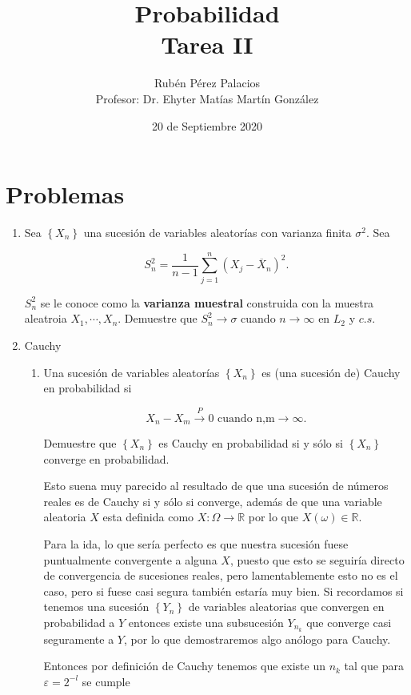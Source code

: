\documentclass[letterpaper]{article}
\title{Probabilidad \\Tarea II}
\author{Rubén Pérez Palacios\\Profesor: Dr. Ehyter Matías Martín González}
\date{20 de Septiembre 2020}
\newcommand{\pars}[1]{\left( #1 \right) }
\newcommand{\set}[1]{\left \{ #1 \right\} }
\newcommand{\R}{\mathbb{R}}
\newcommand{\1}{\mathbbm{1}}
\begin{document}
	\maketitle
    
    \section*{Problemas}

    \begin{enumerate}
        
        \item Sea $\set{X_n}$ una sucesión de variables aleatorías con varianza finita $\sigma^2$. Sea 
		
		\[S_n^2 = \frac{1}{n-1}\sum_{j=1}^n \pars{X_j - \overline{X}_n}^2.\]

		$S_n^2$ se le conoce como la \textbf{varianza muestral} construida con la muestra aleatroia \linebreak $X_1,\cdots,X_n$. Demuestre que $S_n^2\rightarrow\sigma$ cuando $n \rightarrow \infty$ en $L_2$ y $c.s$.

		\item Cauchy
		
		\begin{enumerate}
			\item Una sucesión de variables aleatorías $\set{X_n}$ es (una sucesión de) Cauchy en probabilidad si
			
			\[X_n-X_m\xrightarrow{P} 0 \text{ cuando n,m}\rightarrow\infty.\]

			Demuestre que $\set{X_n}$ es Cauchy en probabilidad si y sólo si $\set{X_n}$ converge en probabilidad.

			Esto suena muy parecido al resultado de que una sucesión de números reales es de Cauchy si y sólo si converge, además de que una variable aleatoria $X$ esta definida como $X:\Omega\rightarrow\R$ por lo que $X(\omega)\in\R$. 
			
			
			Para la ida, lo que sería perfecto es que nuestra sucesión fuese puntualmente convergente a alguna $X$, puesto que esto se seguiría directo de convergencia de sucesiones reales, pero lamentablemente esto no es el caso, pero si fuese casi segura también estaría muy bien. Si recordamos si tenemos una sucesión $\set{Y_n}$ de variables aleatorias que convergen en probabilidad a $Y$ entonces existe una subsucesión $Y_{n_k}$ que converge casi seguramente a $Y$, por lo que demostraremos algo anólogo para Cauchy.

			Entonces por definición de Cauchy tenemos que existe un $n_k$ tal que
			para $\varepsilon = 2^{-l}$ se cumple


\end{enumerate}
\end{enumerate}
\end{document}
